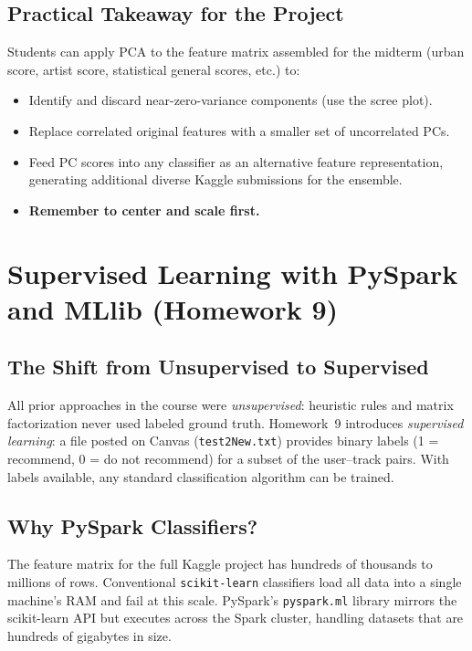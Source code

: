 \documentclass[11pt]{article}
\begin{document}
\subsection{Practical Takeaway for the Project}
Students can apply PCA to the feature matrix assembled for the midterm (urban score, artist score, statistical general scores, etc.) to:
\begin{itemize}
    \item Identify and discard near-zero-variance components (use the scree plot).
    \item Replace correlated original features with a smaller set of uncorrelated PCs.
    \item Feed PC scores into any classifier as an alternative feature representation, generating additional diverse Kaggle submissions for the ensemble.
    \item \textbf{Remember to center and scale first.}
\end{itemize}

\newpage
\section{Supervised Learning with PySpark and MLlib (Homework 9)}

\subsection{The Shift from Unsupervised to Supervised}
All prior approaches in the course were \emph{unsupervised}: heuristic rules and matrix factorization never used labeled ground truth. Homework~9 introduces \emph{supervised learning}: a file posted on Canvas (\texttt{test2New.txt}) provides binary labels (1 = recommend, 0 = do not recommend) for a subset of the user--track pairs. With labels available, any standard classification algorithm can be trained.

\subsection{Why PySpark Classifiers?}
The feature matrix for the full Kaggle project has hundreds of thousands to millions of rows. Conventional \texttt{scikit-learn} classifiers load all data into a single machine's RAM and fail at this scale. PySpark's \texttt{pyspark.ml} library mirrors the scikit-learn API but executes across the Spark cluster, handling datasets that are hundreds of gigabytes in size.
\end{document}
